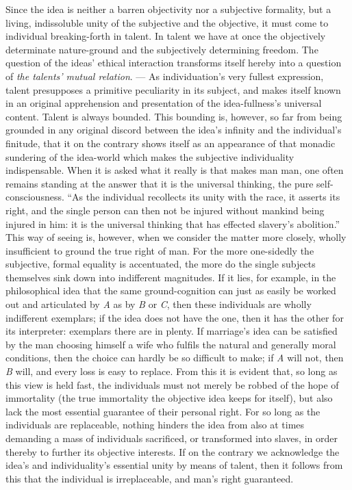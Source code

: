 \documentclass[12pt]{book}
\begin{document}
Since the idea is neither a barren objectivity nor a subjective formality,
but a living, indissoluble unity of the subjective and the objective, it
must come to individual breaking-forth in talent. In talent we have at once
the objectively determinate nature-ground and the subjectively determining
freedom. The question of the ideas' ethical interaction transforms itself
hereby into a question of \emph{the talents' mutual relation}. --- As
individuation's very fullest expression, talent presupposes a primitive
peculiarity in its subject, and makes itself known in an original
apprehension and presentation of the idea-fullness's universal content.
Talent is always bounded. This bounding is, however, so far from being
grounded in any original discord between the idea's infinity and the
individual's finitude, that it on the contrary shows itself as an appearance
of that monadic sundering of the idea-world which makes the subjective
individuality indispensable. When it is asked what it really is that makes
man man, one often remains standing at the answer that it is the universal
thinking, the pure self-consciousness. ``As the individual recollects its
unity with the race, it asserts its right, and the single person can then
not be injured without mankind being injured in him: it is the universal
thinking that has effected slavery's abolition.'' This way of seeing is,
however, when we consider the matter more closely, wholly insufficient to
ground the true right of man. For the more one-sidedly the subjective,
formal equality is accentuated, the more do the single subjects themselves
sink down into indifferent magnitudes. If it lies, for example, in the
philosophical idea that the same ground-cognition can just as easily be
worked out and articulated by \textit{A} as by \textit{B} or \textit{C},
then these individuals are wholly indifferent exemplars; if the idea does
not have the one, then it has the other for its interpreter: exemplars there
are in plenty. If marriage's idea can be satisfied by the man choosing
himself a wife who fulfils the natural and generally moral conditions, then
the choice can hardly be so difficult to make; if \textit{A} will not, then
\textit{B} will, and every loss is easy to replace. From this it is evident
that, so long as this view is held fast, the individuals must not merely be
robbed of the hope of immortality (the true immortality the objective idea
keeps for itself), but also lack the most essential guarantee of their
personal right. For so long as the individuals are replaceable, nothing
hinders the idea from also at times demanding a mass of individuals
sacrificed, or transformed into slaves, in order thereby to further its
objective interests. If on the contrary we acknowledge the idea's and
individuality's essential unity by means of talent, then it follows from
this that the individual is irreplaceable, and man's right guaranteed.
\end{document}
